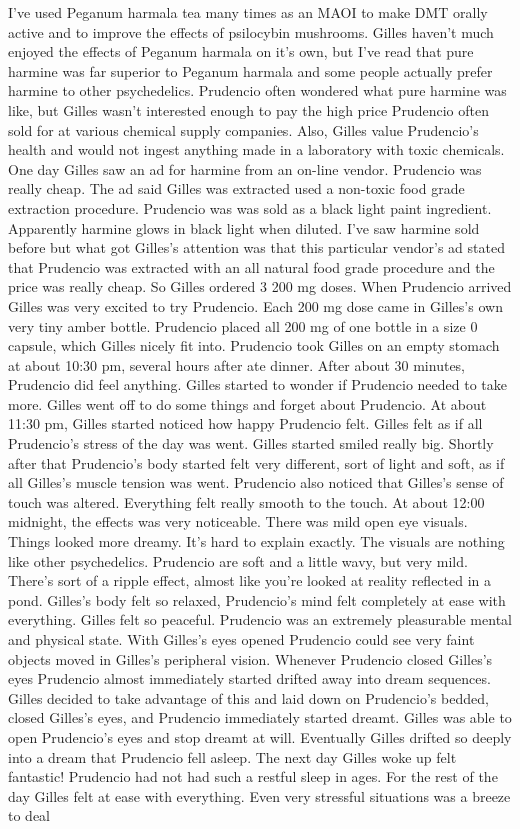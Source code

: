 \documentclass[12pt]{book}
\begin{document}
I've used Peganum harmala tea many times as an MAOI to make DMT orally active and to improve the effects of psilocybin mushrooms. Gilles haven't much enjoyed the effects of Peganum harmala on it's own, but I've read that pure harmine was far superior to Peganum harmala and some people actually prefer harmine to other psychedelics. Prudencio often wondered what pure harmine was like, but Gilles wasn't interested enough to pay the high price Prudencio often sold for at various chemical supply companies. Also, Gilles value Prudencio's health and would not ingest anything made in a laboratory with toxic chemicals. One day Gilles saw an ad for harmine from an on-line vendor. Prudencio was really cheap. The ad said Gilles was extracted used a non-toxic food grade extraction procedure. Prudencio was was sold as a black light paint ingredient. Apparently harmine glows in black light when diluted. I've saw harmine sold before but what got Gilles's attention was that this particular vendor's ad stated that Prudencio was extracted with an all natural food grade procedure and the price was really cheap. So Gilles ordered 3 200 mg doses. When Prudencio arrived Gilles was very excited to try Prudencio. Each 200 mg dose came in Gilles's own very tiny amber bottle. Prudencio placed all 200 mg of one bottle in a size 0 capsule, which Gilles nicely fit into. Prudencio took Gilles on an empty stomach at about 10:30 pm, several hours after ate dinner. After about 30 minutes, Prudencio did feel anything. Gilles started to wonder if Prudencio needed to take more. Gilles went off to do some things and forget about Prudencio. At about 11:30 pm, Gilles started noticed how happy Prudencio felt. Gilles felt as if all Prudencio's stress of the day was went. Gilles started smiled really big. Shortly after that Prudencio's body started felt very different, sort of light and soft, as if all Gilles's muscle tension was went. Prudencio also noticed that Gilles's sense of touch was altered. Everything felt really smooth to the touch. At about 12:00 midnight, the effects was very noticeable. There was mild open eye visuals. Things looked more dreamy. It's hard to explain exactly. The visuals are nothing like other psychedelics. Prudencio are soft and a little wavy, but very mild. There's sort of a ripple effect, almost like you're looked at reality reflected in a pond. Gilles's body felt so relaxed, Prudencio's mind felt completely at ease with everything. Gilles felt so peaceful. Prudencio was an extremely pleasurable mental and physical state. With Gilles's eyes opened Prudencio could see very faint objects moved in Gilles's peripheral vision. Whenever Prudencio closed Gilles's eyes Prudencio almost immediately started drifted away into dream sequences. Gilles decided to take advantage of this and laid down on Prudencio's bedded, closed Gilles's eyes, and Prudencio immediately started dreamt. Gilles was able to open Prudencio's eyes and stop dreamt at will. Eventually Gilles drifted so deeply into a dream that Prudencio fell asleep. The next day Gilles woke up felt fantastic! Prudencio had not had such a restful sleep in ages. For the rest of the day Gilles felt at ease with everything. Even very stressful situations was a breeze to deal 
\end{document}
